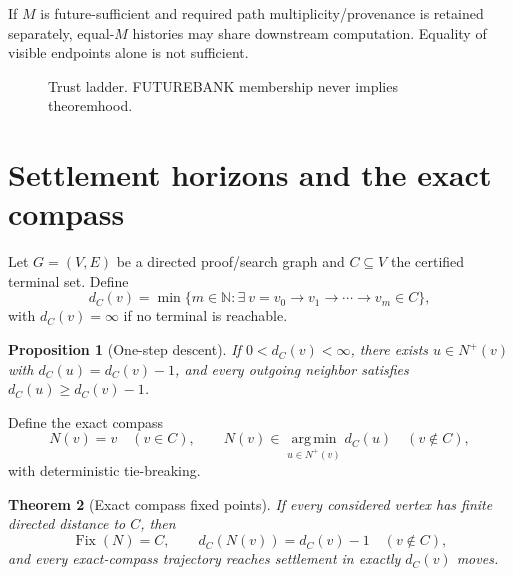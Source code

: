 \documentclass[11pt]{article}
\newtheorem{theorem}{Theorem}[section]
\newtheorem{proposition}[theorem]{Proposition}
\newcommand{\Env}{\mathcal{E}}
\newcommand{\N}{\mathbb{N}}
\newcommand{\Fix}{\operatorname{Fix}}
\newcommand{\argmin}{\operatorname*{arg\,min}}
\begin{document}
If $M$ is future-sufficient and required path multiplicity/provenance is retained separately, equal-$M$ histories may share downstream computation. Equality of visible endpoints alone is not sufficient.

\begin{figure}[ht]
\centering
{}
\caption{Trust ladder. FUTUREBANK membership never implies theoremhood.}
\end{figure}

\section{Settlement horizons and the exact compass}

Let $G=(V,E)$ be a directed proof/search graph and $C\subseteq V$ the certified terminal set. Define
\[
d_C(v)=\min\{m\in\N:\exists\ v=v_0\to v_1\to\cdots\to v_m\in C\},
\]
with $d_C(v)=\infty$ if no terminal is reachable.

\begin{proposition}[One-step descent]
If $0<d_C(v)<\infty$, there exists $u\in N^+(v)$ with $d_C(u)=d_C(v)-1$, and every outgoing neighbor satisfies $d_C(u)\ge d_C(v)-1$.
\end{proposition}

Define the exact compass
\[
N(v)=v\quad(v\in C),\qquad
N(v)\in\argmin_{u\in N^+(v)}d_C(u)\quad(v\notin C),
\]
with deterministic tie-breaking.

\begin{theorem}[Exact compass fixed points]
If every considered vertex has finite directed distance to $C$, then
\[
\Fix(N)=C,
\qquad
d_C(N(v))=d_C(v)-1\quad(v\notin C),
\]
and every exact-compass trajectory reaches settlement in exactly $d_C(v)$ moves.
\end{theorem}
\end{document}
